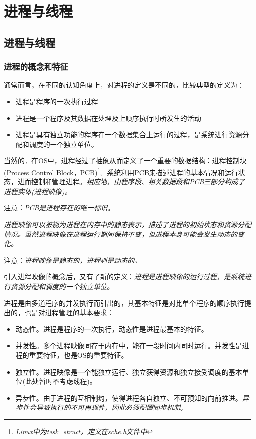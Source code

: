 \chapter{进程与线程}

\section{进程与线程}

\subsection{进程的概念和特征}

    通常而言，在不同的认知角度上，对进程的定义是不同的，比较典型的定义为：

\begin{itemize}
    \item [1)] 进程是程序的一次执行过程
    \item [2)] 进程是一个程序及其数据在处理及上顺序执行时所发生的活动
    \item [3)] 进程是具有独立功能的程序在一个数据集合上运行的过程，是系统进行资源分配和调度的一个独立单位。
\end{itemize}

    当然的，在OS中，进程经过了抽象从而定义了一个重要的数据结构：进程控制块(Process Control Block，PCB)\footnote[1]{\emph{Linux中为task\_struct，定义在sche.h文件中}}。系统利用PCB来描述进程的基本情况和运行状态，进而控制和管理进程。\emph{相应地，由程序段、相关数据段和PCB三部分构成了进程实体(进程映像)。}

    注意：\emph{\color{red}PCB是进程存在的唯一标识}。

    \emph{进程映像可以被视为进程在内存中的静态表示，描述了进程的初始状态和资源分配情况。虽然进程映像在进程运行期间保持不变，但进程本身可能会发生动态的变化。}

    注意：\emph{\color{red}进程映像是静态的，进程则是动态的。}

    引入进程映像的概念后，又有了新的定义：\emph{进程是进程映像的运行过程，是系统进行资源分配和调度的一个独立单位。}

    进程是由多道程序的并发执行而引出的，其基本特征是对比单个程序的顺序执行提出的，也是对进程管理的基本要求：

\begin{itemize}
    \item [1)] 动态性。进程是程序的一次执行，{\color{red}动态性是进程最基本的特征}。
    \item [2)] 并发性。多个进程映像同存于内存中，能在一段时间内同时运行。{\color{red}并发性是进程的重要特征，也是OS的重要特征}。
    \item [3)] 独立性。进程映像是一个能独立运行、独立获得资源和独立接受调度的基本单位(此处暂时不考虑线程)。
    \item [4)] 异步性。由于进程的互相制约，使得进程各自独立、不可预知的向前推进。\emph{\color{red}异步性会导致执行的不可再现性，因此必须配置同步机制}。
\end{itemize}


